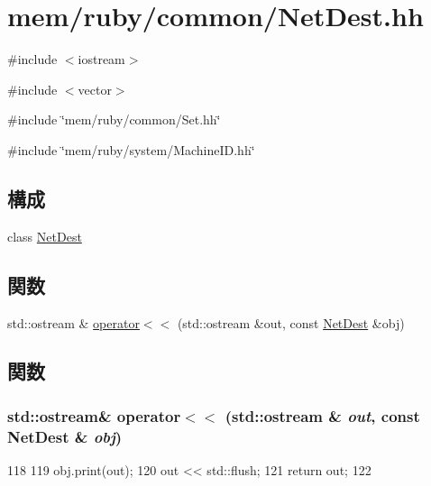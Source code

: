 \hypertarget{NetDest_8hh}{
\section{mem/ruby/common/NetDest.hh}
\label{NetDest_8hh}
}
{\ttfamily \#include $<$iostream$>$}\par
{\ttfamily \#include $<$vector$>$}\par
{\ttfamily \#include \char`\"{}mem/ruby/common/Set.hh\char`\"{}}\par
{\ttfamily \#include \char`\"{}mem/ruby/system/MachineID.hh\char`\"{}}\par
\subsection*{構成}
\begin{DoxyCompactItemize}
\item 
class \hyperlink{classNetDest}{NetDest}
\end{DoxyCompactItemize}
\subsection*{関数}
\begin{DoxyCompactItemize}
\item 
std::ostream \& \hyperlink{NetDest_8hh_a71d062aa08c9df81a017e731e01da327}{operator$<$$<$} (std::ostream \&out, const \hyperlink{classNetDest}{NetDest} \&obj)
\end{DoxyCompactItemize}


\subsection{関数}
\hypertarget{NetDest_8hh_a71d062aa08c9df81a017e731e01da327}{
\subsubsection[{operator$<$$<$}]{\setlength{\rightskip}{0pt plus 5cm}std::ostream\& operator$<$$<$ (std::ostream \& {\em out}, \/  const {\bf NetDest} \& {\em obj})}}
\label{NetDest_8hh_a71d062aa08c9df81a017e731e01da327}



\begin{DoxyCode}
118 {
119     obj.print(out);
120     out << std::flush;
121     return out;
122 }
\end{DoxyCode}
